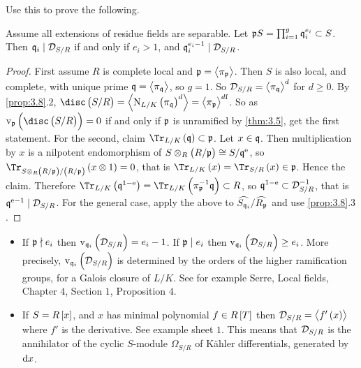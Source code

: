 \pagebreak

Use this to prove the following.

\begin{theorem}
Assume all extensions of residue fields are separable. Let $ \mathfrak{p} S = \prod_{i = 1}^g \mathfrak{q}_i^{e_i} \subset S $. Then $ \mathfrak{q}_i \mid \mathcal{D}_{S / R} $ if and only if $ e_i > 1 $, and $ \mathfrak{q}_i^{e_i - 1} \mid \mathcal{D}_{S / R} $.
\end{theorem}

\begin{proof}
First assume $ R $ is complete local and $ \mathfrak{p} = \left\langle \pi_{\mathfrak{p}} \right\rangle $. Then $ S $ is also local, and complete, with unique prime $ \mathfrak{q} = \left\langle \pi_{\mathfrak{q}} \right\rangle $, so $ g = 1 $. So $ \mathcal{D}_{S / R} = \left\langle \pi_{\mathfrak{q}} \right\rangle^d $ for $ d \ge 0 $. By \ref{prop:3.8}.$ 2 $, $ \disc\br{S / R} = \abr{\N_{L / K}\br{\pi_\qqq}^d} = \abr{\pi_\ppp}^{d\f} $. So as $ \v_\ppp\br{\disc\br{S / R}} = 0 $ if and only if $ \mathfrak{p} $ is unramified by \ref{thm:3.5}, get the first statement. For the second, claim $ \Tr_{L / K}\br{\qqq} \subset \ppp $. Let $ x \in \mathfrak{q} $. Then multiplication by $ x $ is a nilpotent endomorphism of $ S \otimes_R \br{R / \ppp} \cong S / \qqq^\e $, so $ \Tr_{S \otimes_R \br{R / \ppp} / \br{R / \ppp}}\br{x \otimes 1} = 0 $, that is $ \Tr_{L / K}\br{x} = \Tr_{S / R}\br{x} \in \ppp $. Hence the claim. Therefore $ \Tr_{L / K}\br{\qqq^{1 - \e}} = \Tr_{L / K}\br{\pi_\ppp^{-1}\qqq} \subset R $, so $ \mathfrak{q}^{1 - \mathrm{e}} \subset \mathcal{D}_{S / R}^{-1} $, that is $ \mathfrak{q}^{\mathrm{e} - 1} \mid \mathcal{D}_{S / R} $. For the general case, apply the above to $ \widehat{S_{\mathfrak{q}_i}} / \widehat{R_{\mathfrak{p}}} $ and use \ref{prop:3.8}.$ 3 $.
\end{proof}

\begin{fact*}
\hfill
\begin{itemize}
\item If $ \mathfrak{p} \nmid e_i $ then $ \v_{\qqq_i}\br{\DDD_{S / R}} = e_i - 1 $. If $ \mathfrak{p} \mid e_i $ then $ \v_{\qqq_i}\br{\DDD_{S / R}} \ge e_i $. More precisely, $ \v_{\qqq_i}\br{\DDD_{S / R}} $ is determined by the orders of the higher ramification groups, for a Galois closure of $ L / K $. See for example Serre, Local fields, Chapter $ 4 $, Section $ 1 $, Proposition $ 4 $.
\item If $ S = R\sbr{x} $, and $ x $ has minimal polynomial $ f \in R\sbr{T} $ then $ \DDD_{S / R} = \abr{f'\br{x}} $ where $ f' $ is the derivative. See example sheet $ 1 $. This means that $ \mathcal{D}_{S / R} $ is the annihilator of the cyclic $ S $-module $ \Omega_{S / R} $ of K\"ahler differentials, generated by $ \mathrm{d} x $.
\end{itemize}
\end{fact*}

